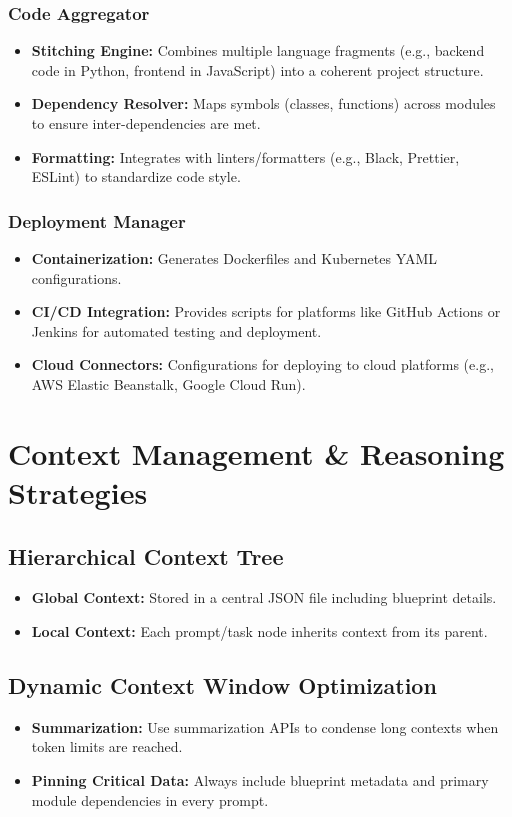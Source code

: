 \documentclass[11pt]{article}
\begin{document}
\subsubsection{Code Aggregator}
\begin{itemize}
    \item \textbf{Stitching Engine:} Combines multiple language fragments (e.g., backend code in Python, frontend in JavaScript) into a coherent project structure.
    \item \textbf{Dependency Resolver:} Maps symbols (classes, functions) across modules to ensure inter-dependencies are met.
    \item \textbf{Formatting:} Integrates with linters/formatters (e.g., Black, Prettier, ESLint) to standardize code style.
\end{itemize}

\subsubsection{Deployment Manager}
\begin{itemize}
    \item \textbf{Containerization:} Generates Dockerfiles and Kubernetes YAML configurations.
    \item \textbf{CI/CD Integration:} Provides scripts for platforms like GitHub Actions or Jenkins for automated testing and deployment.
    \item \textbf{Cloud Connectors:} Configurations for deploying to cloud platforms (e.g., AWS Elastic Beanstalk, Google Cloud Run).
\end{itemize}

\section{Context Management \& Reasoning Strategies}

\subsection{Hierarchical Context Tree}
\begin{itemize}
    \item \textbf{Global Context:} Stored in a central JSON file including blueprint details.
    \item \textbf{Local Context:} Each prompt/task node inherits context from its parent.
\end{itemize}

\subsection{Dynamic Context Window Optimization}
\begin{itemize}
    \item \textbf{Summarization:} Use summarization APIs to condense long contexts when token limits are reached.
    \item \textbf{Pinning Critical Data:} Always include blueprint metadata and primary module dependencies in every prompt.
\end{itemize}
\end{document}
